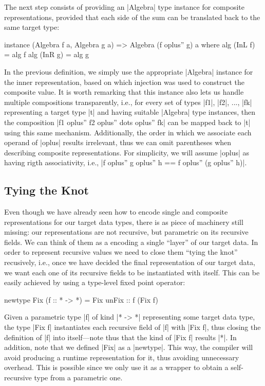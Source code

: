 The next step consists of providing an |Algebra| type instance for composite
representations, provided that each side of the sum can be translated back to
the same target type:

\begin{code}
instance (Algebra f a, Algebra g a) => Algebra (f oplus'' g) a
  where  alg (InL f) = alg f
         alg (InR g) = alg g
\end{code}

In the previous definition, we simply use the appropriate |Algebra| instance for
the inner representation, based on which injection was used to construct the
composite value.
%
It is worth remarking that this instance also lets us handle multiple
compositions transparently, i.e., for every set of types |f1|, |f2|, ..., |fk|
representing a target type |t| and having suitable |Algebra| type instances,
then the composition |f1 oplus'' f2 oplus'' dots oplus'' fk| can be mapped back
to |t| using this same mechanism.
%
Additionally, the order in which we associate each operand of |oplus| results
irrelevant, thus we can omit parentheses when describing composite
representations.
%
For simplicity, we will assume |oplus| as having rigth associativity, i.e., |f
oplus'' g oplus'' h == f oplus'' (g oplus'' h)|.


%
\subsection{Tying the Knot}

Even though we have already seen how to encode single and composite
representations for our target data types, there is as piece of machinery still
missing: our representations are not recursive, but parametric on its recursive
fields.
%
We can think of them as a encoding a single ``layer'' of our target data.
%
In order to represent recursive values we need to close them ``tying the knot''
recusively, i.e., once we have decided the final representation of our target
data, we want each one of its recursive fields to be instantiated with itself.
%
This can be easily achieved by using a type-level fixed point operator:

\begin{code}
newtype Fix (f :: * -> *) = Fix { unFix :: f (Fix f) }
\end{code}
%
Given a parametric type |f| of kind |* -> *| representing some target data type,
the type |Fix f| instantiates each recursive field of |f| with |Fix f|, thus
closing the definition of |f| into itself---note thus that the kind of |Fix f|
results |*|.
%
In addition, note that we defined |Fix| as a |newtype|.
%
This way, the compiler will avoid producing a runtime representation for it,
thus avoiding unnecessary overhead.
%
This is possible since we only use it as a wrapper to obtain a self-recursive
type from a parametric one.


